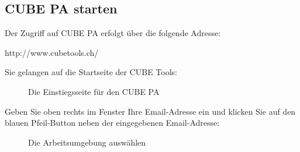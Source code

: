 \subsection{CUBE PA starten}


Der Zugriff auf CUBE PA erfolgt über die folgende Adresse:

\vspace{\baselineskip}

{\color{red} http://www.cubetools.ch/}

\vspace{\baselineskip}

Sie gelangen auf die Startseite der CUBE Tools:

\begin{figure}[H]
\caption{Die Einstiegsseite für den CUBE PA}
\end{figure}

Geben Sie oben rechts im Fenster Ihre Email-Adresse ein und klicken Sie auf den blauen Pfeil-Button neben der eingegebenen Email-Adresse:

\begin{figure}[H]
\caption{Die Arbeitsumgebung auswählen}
\end{figure}


